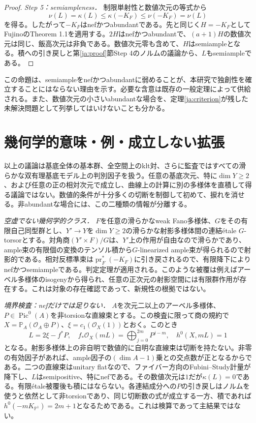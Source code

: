 \documentclass[12pt]{amsart}
\theoremstyle{definition}
\theoremstyle{remark}
\numberwithin{equation}{section}
\newcommand{\cO}{\mathcal{O}}
\DeclareMathOperator{\pr}{pr}
\newcommand{\mP}{\mathbb{P}}
\newcommand{\Pic}{\operatorname{Pic}}
\begin{document}
\begin{proof}
\textit{Step 5：semiampleness．}
制限単射性と数値次元の等式から
\[
 \nu(L)=\kappa(L)\leq\kappa(-K_F)\leq\nu(-K_F)=\nu(L)
\]
を得る。したがって$-K_F$はnefかつabundantである。先と同じく$H=-K_F$としてFujinoのTheorem 1.1を適用する。$2H$はnefかつabundantで、$(a+1)H$の数値次元は同じ、飯高次元は非負である。数値次元零も含めて、$H$はsemiampleとなる。積への引き戻しと第\ref{ja:proof}節Step 4のノルムの議論から、$L$もsemiampleである。
\end{proof}

この命題は、semiampleをnefかつabundantに弱めることが、本研究で独創性を確立することにはならない理由を示す。必要な含意は既存の一般定理によって供給される。また、数値次元の小さいabundantな場合を、定理\ref{ja:criterion}が残した未解決問題として列挙してはいけないことも分かる。

\section{幾何学的意味・例・成立しない拡張}\label{ja:examples}
以上の議論は基底全体の基本群、全空間上のklt対、さらに監査ではすべての滑らかな双有理基底モデル上の判別因子を扱う。任意の基底次元、特に$\dim Y\geq2$、および任意の正の相対次元で成立し、曲線上の計算に別の多様体を直積して得る議論ではない。数値的条件が十分多くの切断を制御して初めて、捩れを消せる。非abundantな場合には、この二種類の情報が分離する。

\textit{空虚でない幾何学的クラス．}
$F$を任意の滑らかなweak Fano多様体、$G$をその有限自己同型群とし、$Y'\to Y$を$\dim Y\geq2$の滑らかな射影多様体間の連結étale $G$-torsorとする。対角商$(Y'\times F)/G$は、$Y'$上の作用が自由なので滑らかであり、ample束の有限個の変換のテンソル積から$G$-linearized ample束が得られるので射影的である。相対反標準束は$\pr_F^*(-K_F)$に引き戻されるので、有限降下によりnefかつsemiampleである。判定定理が適用される。このような被覆は例えばアーベル多様体のisogenyから得られ、任意の正次元の射影空間には有限群作用が存在する。これは対象の存在確認であって、新規性の根拠ではない。

\textit{境界検査：nefだけでは足りない．}
$A$を次元二以上のアーベル多様体、$P\in\Pic^0(A)$を非torsionな直線束とする。この検査に限って商の規約で$X=\mP_A(\cO_A\oplus P)$、$\xi=c_1(\cO_X(1))$とおく。このとき
\[
 L=2\xi-f^*P,\quad
 f_*\cO_X(mL)=\bigoplus_{j=0}^{2m}P^{j-m},\quad h^0(X,mL)=1
\]
となる。射影多様体上の非自明で数値的に自明な直線束は切断を持たない。非零の有効因子があれば、ample因子の$(\dim A-1)$乗との交点数が正となるからである。二つの直線束はunitary flatなので、ファイバー方向のFubini--Study計量が降下し、$L$はsemipositive、特にnefである。その数値次元は$1$だが$\kappa(L)=0$である。有限étale被覆後も積にはならない。各連結成分への$P$の引き戻しはノルムを使うと依然として非torsionであり、同じ切断数の式が成立する一方、積であれば$h^0(-mK_{\mP^1})=2m+1$となるためである。これは検算であって主結果ではない。
\end{document}

